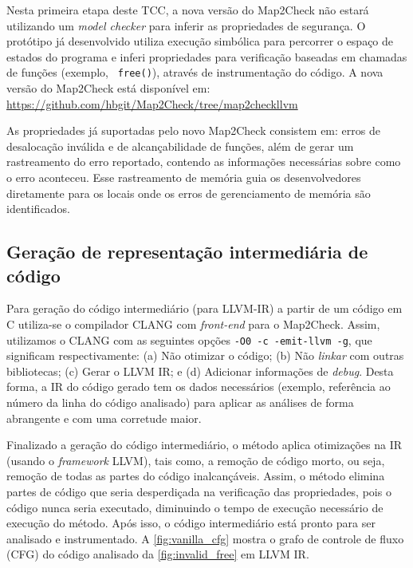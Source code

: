 Nesta primeira etapa deste TCC, a nova versão do Map2Check não estará utilizando um \textit{model checker} para inferir as propriedades de segurança. O protótipo já desenvolvido utiliza execução simbólica para percorrer o espaço de estados do programa e inferi propriedades para verificação baseadas em chamadas de funções (exemplo, \texttt{ free()}), através de instrumentação do código. A nova versão do Map2Check está disponível em: \url{https://github.com/hbgit/Map2Check/tree/map2checkllvm} 
\par
As propriedades já suportadas pelo novo Map2Check consistem em: erros de desalocação inválida e de alcançabilidade de funções, além de gerar um rastreamento do erro reportado, contendo as informações necessárias sobre como o erro aconteceu.  Esse rastreamento de memória guia os desenvolvedores diretamente para os locais onde os erros de gerenciamento de memória são identificados. 


\subsection{Geração de representação intermediária de código}
Para geração do código intermediário (para LLVM-IR)  a partir de um código em C utiliza-se o compilador CLANG com \textit{front-end} para o Map2Check. Assim,  utilizamos o CLANG com as seguintes opções \texttt{-O0 -c -emit-llvm -g}, que significam respectivamente: (a) Não otimizar o código; (b) Não \textit{linkar} com outras bibliotecas; (c) Gerar o LLVM IR; e (d) Adicionar informações de \textit{debug}. Desta forma, a IR do código gerado tem os dados necessários (exemplo, referência ao número da linha do código analisado) para aplicar as análises de forma abrangente e com uma corretude maior.

\newpage
\par
Finalizado a geração do código intermediário, o método aplica otimizações na IR (usando o \textit{framework} LLVM), tais como, a remoção de código morto, ou seja, remoção de todas as partes do código inalcançáveis. Assim, o método elimina partes de código que seria desperdiçada na verificação das propriedades, pois o código nunca seria executado, diminuindo o tempo de execução necessário de execução do método. Após isso, o código intermediário está pronto para ser analisado e instrumentado. A \autoref{fig:vanilla_cfg} mostra o grafo de controle de fluxo (CFG) do código analisado da \autoref{fig:invalid_free} em LLVM IR.

